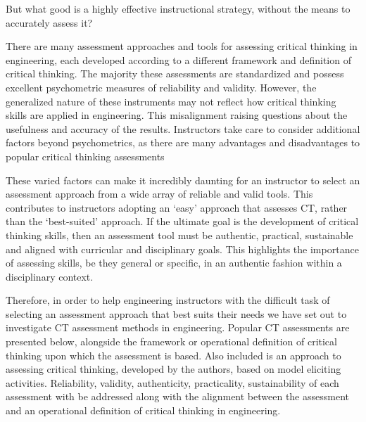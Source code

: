 But what good is a highly effective instructional strategy, without the means to accurately assess it?

There are many assessment approaches and tools for assessing critical thinking in engineering, each developed according to a different framework and definition of critical thinking.  The majority these assessments are standardized and possess excellent psychometric measures of reliability and validity.  However, the generalized nature of these instruments may not reflect how critical thinking skills are applied in engineering.  This misalignment raising questions about the usefulness and accuracy of the results.  Instructors take care to consider additional factors beyond psychometrics, as there are many advantages and disadvantages to popular critical thinking assessments\cite{Ku_2009}

These varied factors can make it incredibly daunting for an instructor to select an assessment approach from a wide array of reliable and valid tools.  This contributes to instructors adopting an ‘easy’ approach that assesses CT, rather than the ‘best-suited’ approach.  If the ultimate goal is the development of critical thinking skills, then an assessment tool must be authentic, practical, sustainable and aligned with curricular and disciplinary goals.  This highlights the importance of assessing skills, be they general or specific, in an authentic fashion within a disciplinary context.

Therefore, in order to help engineering instructors with the difficult task of selecting an assessment approach that best suits their needs we have set out to investigate CT assessment methods in engineering.   Popular CT assessments are presented below, alongside the framework or operational definition of critical thinking upon which the assessment is based.  Also included is an approach to assessing critical thinking, developed by the authors, based on model eliciting activities\cite{DiefesDux:2004fq, Kaupp:2014un}. Reliability, validity, authenticity, practicality, sustainability of each assessment with be addressed along with the alignment between the assessment and an operational definition of critical thinking in engineering.

